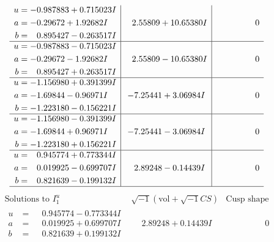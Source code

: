 \documentclass[1p]{elsarticle_modified}
\theoremstyle{definition}
\newcommand{\I}{\sqrt{-1}}
\begin{document}
$$\begin{array}{c|c|c}
\begin{aligned}
u &= -0.987883 + 0.715023 I \\
a &= -0.29672 + 1.92682 I \\
b &= \phantom{-}0.895427 - 0.263517 I\end{aligned}
 & \phantom{-}2.55809 + 10.65380 I & \phantom{-0.000000 } 0 \\ \hline\begin{aligned}
u &= -0.987883 - 0.715023 I \\
a &= -0.29672 - 1.92682 I \\
b &= \phantom{-}0.895427 + 0.263517 I\end{aligned}
 & \phantom{-}2.55809 - 10.65380 I & \phantom{-0.000000 } 0 \\ \hline\begin{aligned}
u &= -1.156980 + 0.391399 I \\
a &= -1.69844 - 0.96971 I \\
b &= -1.223180 - 0.156221 I\end{aligned}
 & -7.25441 + 3.06984 I & \phantom{-0.000000 } 0 \\ \hline\begin{aligned}
u &= -1.156980 - 0.391399 I \\
a &= -1.69844 + 0.96971 I \\
b &= -1.223180 + 0.156221 I\end{aligned}
 & -7.25441 - 3.06984 I & \phantom{-0.000000 } 0 \\ \hline\begin{aligned}
u &= \phantom{-}0.945774 + 0.773344 I \\
a &= \phantom{-}0.019925 - 0.699707 I \\
b &= \phantom{-}0.821639 - 0.199132 I\end{aligned}
 & \phantom{-}2.89248 - 0.14439 I & \phantom{-0.000000 } 0\\
 \hline 
 \end{array}$$\newpage$$\begin{array}{c|c|c}  
\text{Solutions to }I^u_{1}& \I (\text{vol} + \sqrt{-1}CS) & \text{Cusp shape}\\
 \hline 
\begin{aligned}
u &= \phantom{-}0.945774 - 0.773344 I \\
a &= \phantom{-}0.019925 + 0.699707 I \\
b &= \phantom{-}0.821639 + 0.199132 I\end{aligned}
 & \phantom{-}2.89248 + 0.14439 I & \phantom{-0.000000 } 0 \\ \hline\begin{aligned}

\end{aligned}
\end{array}$$
\end{document}
